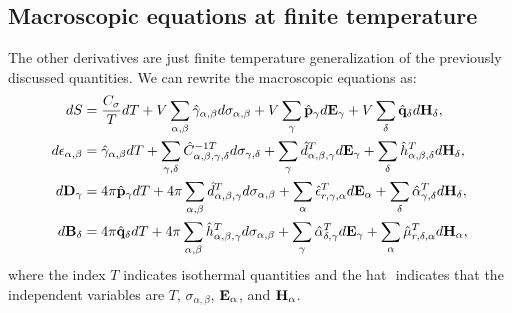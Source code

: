 \documentclass[12pt,a4paper]{article}
\begin{document}
{\subsection{\color{orange}Macroscopic equations at finite temperature}
The other derivatives are just finite temperature generalization of the
previously discussed quantities. We can rewrite the macroscopic equations as:
\begin{align}
dS&= {C_\sigma\over T} dT+ V \sum_{\alpha,\beta} \hat \gamma_{\alpha,\beta} 
d\sigma_{\alpha,\beta}
+ V \sum_\gamma \hat {\bf p}_\gamma d{\bf E}_{\gamma} + 
V \sum_\delta \hat {\bf q}_\delta d{\bf H}_{\delta}, \\
d\epsilon_{\alpha,\beta}&=  \hat \gamma_{\alpha,\beta} dT + 
\sum_{\gamma,\delta} \hat C^{-1 T}_{\alpha,\beta,\gamma,\delta} 
d \sigma_{\gamma,\delta} + \sum_\gamma \hat d^T_{\alpha,\beta,\gamma} 
d{\bf E}_{\gamma} +
\sum_\delta \hat h^T_{\alpha,\beta,\delta} d{\bf H}_{\delta}, \\
d{\bf D}_\gamma&= 
4 \pi \hat {\bf p}_\gamma dT + 4 \pi \sum_{\alpha,\beta} \hat 
d^T_{\alpha,\beta,\gamma} d\sigma_{\alpha,\beta} +
\sum_\alpha \hat \epsilon^T_{r,\gamma,\alpha} d{\bf E}_{\alpha} + 
\sum_\delta \hat \alpha^T_{\gamma,\delta} d{\bf H}_{\delta}, \\
d{\bf B}_\delta&= 
4 \pi \hat {\bf q}_\delta dT + 4 \pi \sum_{\alpha,\beta}
\hat h^T_{\alpha,\beta,\gamma}
d\sigma_{\alpha,\beta}
+\sum_\gamma \hat \alpha^T_{\delta,\gamma}
d{\bf E}_{\gamma}+ 
\sum_\alpha \hat \mu^T_{r,\delta,\alpha}
d{\bf H}_{\alpha}, 
\end{align}
where the index $T$ indicates isothermal quantities and the hat $\hat{}$
indicates that the independent variables are $T$, $\sigma_{\alpha,\beta}$, 
${\bf E}_\alpha$, and ${\bf H}_\alpha$.  
}

\newpage
\end{document}
